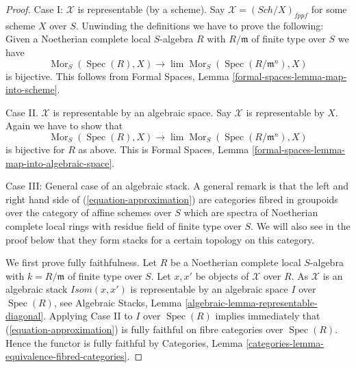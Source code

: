\documentclass{stacks-project}
\theoremstyle{plain}
\theoremstyle{definition}
\theoremstyle{remark}
\numberwithin{equation}{subsection}
\def\lim{\mathop{\mathrm{lim}}\nolimits}
\def\Spec{\mathop{\mathrm{Spec}}}
\def\Sch{\mathit{Sch}}
\def\Mor{\mathop{\mathrm{Mor}}\nolimits}
\begin{document}
\begin{proof}
Case I: $\mathcal{X}$ is representable (by a scheme). Say
$\mathcal{X} = (\Sch/X)_{fppf}$ for some scheme $X$ over $S$.
Unwinding the definitions we have to prove the following: Given
a Noetherian complete local $S$-algebra $R$ with $R/\mathfrak m$ of
finite type over $S$ we have
$$
\Mor_S(\Spec(R), X) \longrightarrow \lim \Mor_S(\Spec(R/\mathfrak m^n), X)
$$
is bijective. This follows from Formal Spaces, Lemma
\ref{formal-spaces-lemma-map-into-scheme}.

\medskip\noindent
Case II. $\mathcal{X}$ is representable by an algebraic space. Say
$\mathcal{X}$ is representable by $X$. Again we have to show that
$$
\Mor_S(\Spec(R), X) \longrightarrow \lim \Mor_S(\Spec(R/\mathfrak m^n), X)
$$
is bijective for $R$ as above. This is Formal Spaces, Lemma
\ref{formal-spaces-lemma-map-into-algebraic-space}.

\medskip\noindent
Case III: General case of an algebraic stack. A general remark is that
the left and right hand side of (\ref{equation-approximation}) are
categories fibred in groupoids over the category of affine schemes
over $S$ which are spectra of Noetherian complete local rings
with residue field of finite type over $S$. We will also see in the
proof below that they form stacks for a certain topology on this
category.

\medskip\noindent
We first prove fully faithfulness. Let $R$ be a Noetherian complete
local $S$-algebra with $k = R/\mathfrak m$ of finite type over $S$.
Let $x, x'$ be objects of $\mathcal{X}$ over $R$. As $\mathcal{X}$ is
an algebraic stack $\mathit{Isom}(x, x')$ is representable by an
algebraic space $I$ over $\Spec(R)$, see
Algebraic Stacks, Lemma \ref{algebraic-lemma-representable-diagonal}.
Applying Case II to $I$ over $\Spec(R)$ implies immediately that
(\ref{equation-approximation}) is fully faithful on fibre categories over
$\Spec(R)$. Hence the functor is fully faithful by
Categories, Lemma \ref{categories-lemma-equivalence-fibred-categories}.


\end{proof}
\end{document}
